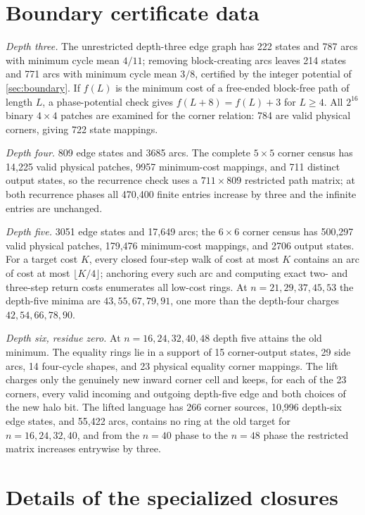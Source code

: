 \documentclass[10pt]{article}
\theoremstyle{remark}
\begin{document}
\section{Boundary certificate data}\label{app:boundary}

\emph{Depth three.}  The unrestricted depth-three edge graph has 222 states and
787 arcs with minimum cycle mean $4/11$; removing block-creating arcs leaves 214
states and 771 arcs with minimum cycle mean $3/8$, certified by the integer
potential of \cref{sec:boundary}.  If $f(L)$ is the minimum cost of a free-ended
block-free path of length $L$, a phase-potential check gives $f(L+8)=f(L)+3$ for
$L\ge4$.  All $2^{16}$ binary $4\times4$ patches are examined for the corner
relation: 784 are valid physical corners, giving 722 state mappings.

\emph{Depth four.}  809 edge states and 3685 arcs.  The complete $5\times5$ corner
census has 14,225 valid physical patches, 9957 minimum-cost mappings, and 711
distinct output states, so the recurrence check uses a $711\times809$ restricted
path matrix; at both recurrence phases all 470,400 finite entries increase by
three and the infinite entries are unchanged.

\emph{Depth five.}  3051 edge states and 17,649 arcs; the $6\times6$ corner census
has 500,297 valid physical patches, 179,476 minimum-cost mappings, and 2706 output
states.  For a target cost $K$, every closed four-step walk of cost at most $K$
contains an arc of cost at most $\lfloor K/4\rfloor$; anchoring every such arc and
computing exact two- and three-step return costs enumerates all low-cost rings.
At $n=21,29,37,45,53$ the depth-five minima are $43,55,67,79,91$, one more than
the depth-four charges $42,54,66,78,90$.

\emph{Depth six, residue zero.}  At $n=16,24,32,40,48$ depth five attains the
old minimum.  The equality rings lie in a support of 15 corner-output states, 29
side arcs, 14 four-cycle shapes, and 23 physical equality corner mappings.  The
lift charges only the genuinely new inward corner cell and keeps, for each of
the 23 corners, every valid incoming and outgoing depth-five edge and both
choices of the new halo bit.  The lifted language has 266 corner sources, 10,996
depth-six edge states, and 55,422 arcs, contains no ring at the old target for
$n=16,24,32,40$, and from the $n=40$ phase to the $n=48$ phase the restricted
matrix increases entrywise by three.

\section{Details of the specialized closures}\label{app:closures}
\end{document}
